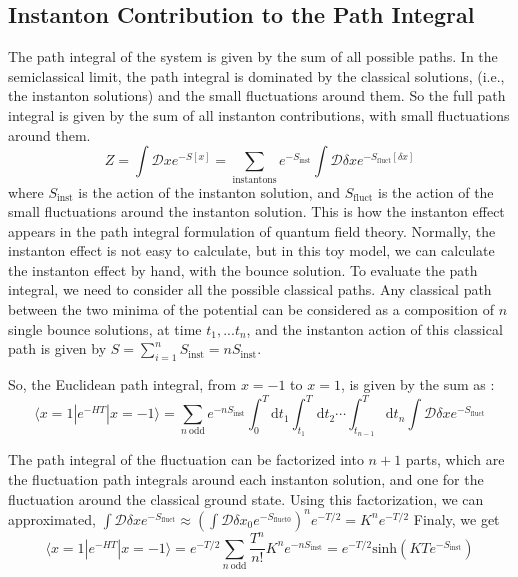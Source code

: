 \documentclass{article}
\begin{document}
\subsection{Instanton Contribution to the Path Integral}

The path integral of the system is given by the sum of all possible paths. In the semiclassical limit, the path integral is dominated by the classical solutions, (i.e., the instanton solutions) and the small fluctuations around them.
So the full path integral is given by the sum of all instanton contributions, with small fluctuations around them.
\begin{equation}
    Z = \int \mathcal{D}x e^{-S[x]} = \sum_{\text{instantons}} e^{-S_{\text{inst}}} \int \mathcal{D}\delta x e^{-S_{\text{fluct}}[\delta x]}
\end{equation}
where $S_{\text{inst}}$ is the action of the instanton solution, and $S_{\text{fluct}}$ is the action of the small fluctuations around the instanton solution.
This is how the instanton effect appears in the path integral formulation of quantum field theory. Normally, the instanton effect is not easy to calculate, but in this toy model, we can calculate the instanton effect by hand, with the bounce solution.
To evaluate the path integral, we need to consider all the possible classical paths.
Any classical path between the two minima of the potential can be considered as a composition of $n$ single bounce solutions, at time $t_1, ... t_n$, and the instanton action of this classical path is given by $S = \sum_{i=1}^n S_{\text{inst}}=nS_{\text{inst}}$.

So, the Euclidean path integral, from $x = -1$ to $x = 1$, is given by the sum as :
\begin{equation}
    \langle x = 1 | e^{-HT} | x = -1 \rangle = \sum_{n \ \text{odd}} e^{-nS_{\text{inst}}} \int_{0}^T \text{d}t_1 \int_{t_1}^T \text{d}t_2 \cdots \int_{t_{n-1}}^T \text{d}t_n \int \mathcal{D}\delta x e^{-S_{\text{fluct}}}
\end{equation}

The path integral of the fluctuation can be factorized into $n+1$ parts, which are the fluctuation path integrals around each instanton solution, and one for the fluctuation around the classical ground state.
Using this factorization, we can approximated, $\int \mathcal{D}\delta x e^{-S_{\text{fluct}}} \approx \left( \int \mathcal{D}\delta x_0 e^{-S_{\text{fluct}0}} \right)^n e^{-T/2}=K^n e^{-T/2}$
Finaly, we get
\begin{equation}
    \langle x = 1 | e^{-HT} | x = -1 \rangle = e^{-T/2} \sum_{n \ \text{odd}} \frac{T^n}{n!} K^n e^{-nS_{\text{inst}}}= e^{-T/2}  \text{sinh}(KT e^{-S_{\text{inst}}})
\end{equation}
\end{document}
